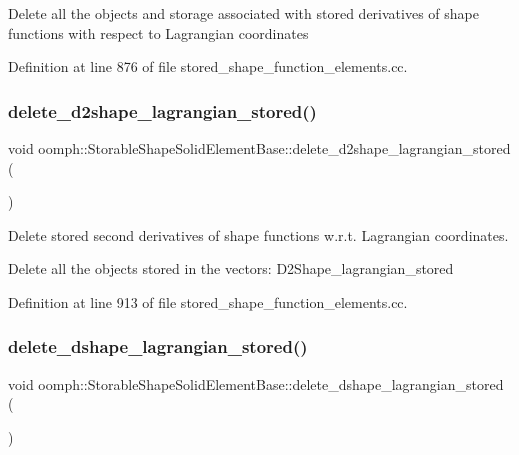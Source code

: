Delete all the objects and storage associated with stored derivatives of shape functions with respect to Lagrangian coordinates 

Definition at line 876 of file stored\+\_\+shape\+\_\+function\+\_\+elements.\+cc.

\mbox{\label{classoomph_1_1StorableShapeSolidElementBase_ac91c1ee2d7543ba8d944a0d8d4f6c10c}} 
\subsubsection{\texorpdfstring{delete\+\_\+d2shape\+\_\+lagrangian\+\_\+stored()}{delete\_d2shape\_lagrangian\_stored()}}
{\footnotesize\ttfamily void oomph\+::\+Storable\+Shape\+Solid\+Element\+Base\+::delete\+\_\+d2shape\+\_\+lagrangian\+\_\+stored (\begin{DoxyParamCaption}{ }\end{DoxyParamCaption})}



Delete stored second derivatives of shape functions w.\+r.\+t. Lagrangian coordinates. 

Delete all the objects stored in the vectors\+: D2\+Shape\+\_\+lagrangian\+\_\+stored 

Definition at line 913 of file stored\+\_\+shape\+\_\+function\+\_\+elements.\+cc.

\mbox{\label{classoomph_1_1StorableShapeSolidElementBase_ae96e6b54024149a8673671f1c418eb06}} 
\subsubsection{\texorpdfstring{delete\+\_\+dshape\+\_\+lagrangian\+\_\+stored()}{delete\_dshape\_lagrangian\_stored()}}
{\footnotesize\ttfamily void oomph\+::\+Storable\+Shape\+Solid\+Element\+Base\+::delete\+\_\+dshape\+\_\+lagrangian\+\_\+stored (\begin{DoxyParamCaption}{ }\end{DoxyParamCaption})}



